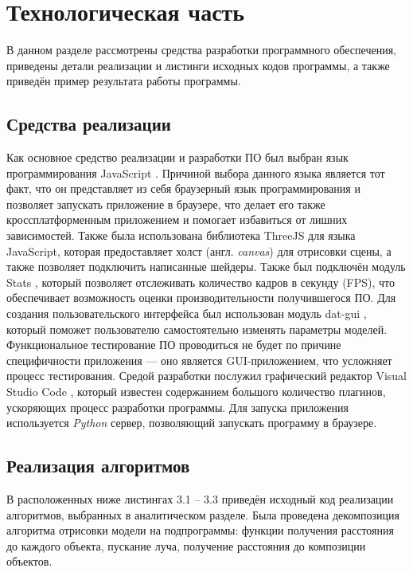 \section{Технологическая часть}

В  данном  разделе  рассмотрены  средства  разработки  программного
обеспечения, приведены детали реализации и листинги исходных кодов
программы, а также приведён пример результата работы программы.

\subsection{Средства реализации}
Как  основное  средство  реализации  и  разработки  ПО  был  выбран  язык
программирования  JavaScript \cite{js}.
Причиной  выбора  данного  языка  является  тот факт,  что  он  представляет из себя браузерный язык  программирования  и  позволяет запускать приложение в браузере, что делает его также кроссплатформенным приложением  и  помогает  избавиться  от  лишних  зависимостей.
Также  была использована библиотека ThreeJS \cite{threejs} для языка JavaScript, которая предоставляет холст  (англ.  \textit{canvas})  для  отрисовки  сцены,  а  также  позволяет  подключить написанные шейдеры.
Также был подключён модуль Stats \cite{stats}, который позволяет
отслеживать  количество  кадров  в  секунду  (FPS),  что  обеспечивает возможность оценки
производительности  получившегося  ПО.
Для  создания  пользовательского интерфейса  был  использован  модуль  dat-gui \cite{datgui},  который  поможет  пользователю
самостоятельно  изменять  параметры  моделей.
Функциональное  тестирование ПО  проводиться  не  будет  по  причине  специфичности  приложения  --- оно является  GUI-приложением,  что  усложняет  процесс  тестирования.
Средой разработки  послужил  графический  редактор  Visual  Studio  Code \cite{vscode},  который
известен  содержанием  большого  количество  плагинов,  ускоряющих  процесс
разработки  программы.
Для запуска приложения используется \textit{Python} \cite{python} сервер, позволяющий запускать программу в браузере.


\subsection{Реализация алгоритмов}

В  расположенных  ниже  листингах  3.1  --  3.3  приведён  исходный  код
реализации алгоритмов, выбранных в аналитическом разделе.
Была проведена декомпозиция  алгоритма  отрисовки  модели  на  подпрограммы:  функции
получения расстояния до каждого объекта, пускание луча, получение расстояния
до композиции объектов.

